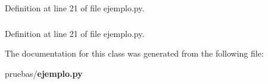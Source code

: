 \-Definition at line 21 of file ejemplo.\-py.

\subsubsection[{sw}]{}\label{classpruebas_1_1ejemplo_1_1_main_window_adaeb2bbf0b2eb94c9300b7eae7c8a60e}


\-Definition at line 21 of file ejemplo.\-py.



\-The documentation for this class was generated from the following file\-:\begin{DoxyCompactItemize}
\item 
pruebas/{\bf ejemplo.\-py}\end{DoxyCompactItemize}
